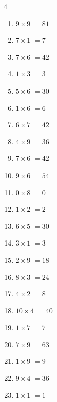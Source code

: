 \begin{multicols}{4}
\begin{enumerate}
  \item $9\times 9$
        $=81$

  \item $7\times 1$
        $=7$

  \item $7\times 6$
        $=42$

  \item $1\times 3$
        $=3$

  \item $5\times 6$
        $=30$

  \item $1\times 6$
        $=6$

  \item $6\times 7$
        $=42$

  \item $4\times 9$
        $=36$

  \item $7\times 6$
        $=42$

  \item $9\times 6$
        $=54$

  \item $0\times 8$
        $=0$

  \item $1\times 2$
        $=2$

  \item $6\times 5$
        $=30$

  \item $3\times 1$
        $=3$

  \item $2\times 9$
        $=18$

  \item $8\times 3$
        $=24$

  \item $4\times 2$
        $=8$

  \item $10\times 4$
        $=40$

  \item $1\times 7$
        $=7$

  \item $7\times 9$
        $=63$

  \item $1\times 9$
        $=9$

  \item $9\times 4$
        $=36$

  \item $1\times 1$
        $=1$


\end{enumerate}
\end{multicols}
